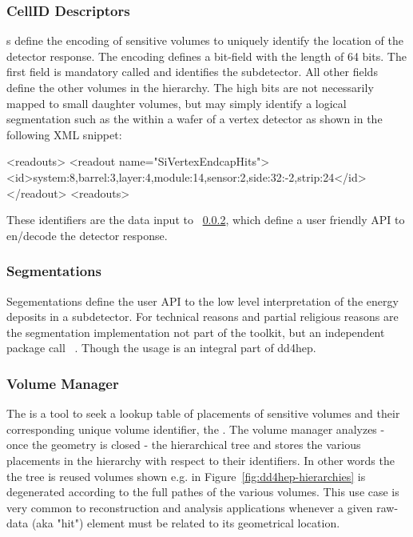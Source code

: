 \documentclass[10pt,a4paper]{article}
\begin{document}
\subsubsection{CellID Descriptors}
\label{sec:dd4hep-manual-readout-iddescriptors}
\noindent
{}s define the encoding of sensitive volumes to uniquely identify
the location of the detector response. The encoding defines a bit-field with
the length of 64 bits. The first field is mandatory called  and 
identifies the subdetector. All other fields define the other volumes in the 
hierarchy. The high bits are not necessarily mapped to small daughter volumes,
but may simply identify a logical segmentation such as the  
within a wafer of a vertex detector as shown in the following XML snippet:
\begin{code}
<readouts>
  <readout name="SiVertexEndcapHits">
    <id>system:8,barrel:3,layer:4,module:14,sensor:2,side:32:-2,strip:24</id>
  </readout>
<readouts>
\end{code}
These identifiers are the data input to 
~\ref{sec:dd4hep-manual-readout-segmentations},
which define a user friendly API to en/decode the detector response.

\subsubsection{Segmentations}
\label{sec:dd4hep-manual-readout-segmentations}
\noindent
Segementations define the user API to the low level interpretation of
the energy deposits in a subdetector. For technical reasons and partial
religious reasons are the segmentation implementation not part of the \DDhep 
toolkit, but an independent package call 
~\cite{bib:DDSegmentations}. Though the usage is an 
integral part of dd4hep.

\subsubsection{Volume Manager}
\noindent
The  is a tool to seek a lookup table of placements of 
sensitive volumes and their corresponding unique volume identifier, the 
. The volume manager analyzes - once the geometry is closed -
the hierarchical tree and stores the various placements in the hierarchy 
with respect to their identifiers. In other words the the tree is 
reused volumes shown e.g. in Figure~\ref{fig:dd4hep-hierarchies} is 
degenerated  according to the full pathes of the various volumes. This 
use case is very common to reconstruction and analysis applications
whenever a given raw-data (aka "hit") element must be related to its
geometrical location.
\end{document}
